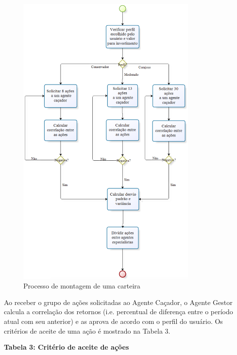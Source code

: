\begin{figure}[h]
\centering
\label{f14}
\includegraphics[width=0.8\textwidth]{figuras/f14}
\caption{Processo de montagem de uma carteira}

\end{figure}


Ao receber o grupo de ações solicitadas ao Agente Caçador, o Agente Gestor calcula a correlação dos retornos (i.e. percentual de diferença entre o período atual com seu anterior) e as aprova de acordo com o perfil do usuário. Os critérios de aceite de uma ação é mostrado na Tabela 3.

\textbf{Tabela 3: Critério de aceite de ações}

